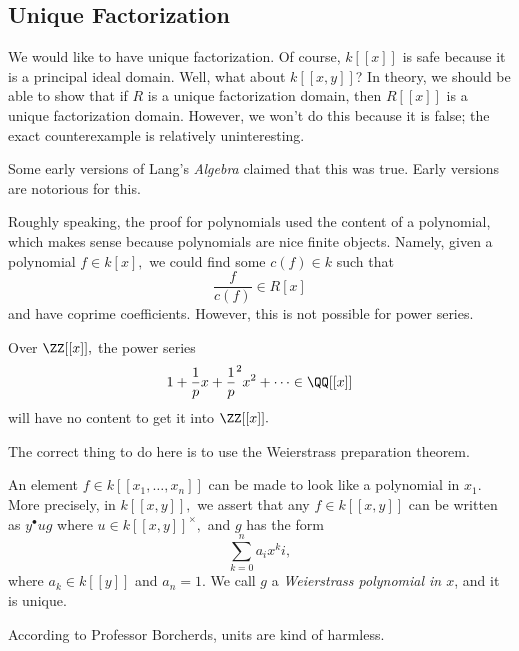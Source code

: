 \documentclass[../notes.tex]{subfiles}
\begin{document}
\subsection{Unique Factorization}
We would like to have unique factorization. Of course, $k[[x]]$ is safe because it is a principal ideal domain. Well, what about $k[[x,y]]$? In theory, we should be able to show that if $R$ is a unique factorization domain, then $R[[x]]$ is a unique factorization domain. However, we won't do this because it is false; the exact counterexample is relatively uninteresting.
\begin{remark}
	Some early versions of Lang's \textit{Algebra} claimed that this was true. Early versions are notorious for this.
\end{remark}
Roughly speaking, the proof for polynomials used the content of a polynomial, which makes sense because polynomials are nice finite objects. Namely, given a polynomial $f\in k[x],$ we could find some $c(f)\in k$ such that
\[\frac f{c(f)}\in R[x]\]
and have coprime coefficients. However, this is not possible for power series.
\begin{example}
	Over $\ZZ[[x]],$ the power series
	\[1+\frac1px+\frac1p^2x^2+\cdots\in\QQ[[x]]\]
	will have no content to get it into $\ZZ[[x]].$
\end{example}
The correct thing to do here is to use the Weierstrass preparation theorem.
\begin{theorem}
	An element $f\in k[[x_1,\ldots,x_n]]$ can be made to look like a polynomial in $x_1.$ More precisely, in $k[[x,y]],$ we assert that any $f\in k[[x,y]]$ can be written as $y^\bullet ug$ where $u\in k[[x,y]]^\times,$ and $g$ has the form
	\[\sum_{k=0}^na_ix^ki,\]
	where $a_k\in k[[y]]$ and $a_n=1.$ We call $g$ a \textit{Weierstrass polynomial in $x$}, and it is unique.
\end{theorem}
\begin{remark}
	According to Professor Borcherds, units are kind of harmless.
\end{remark}
\end{document}
